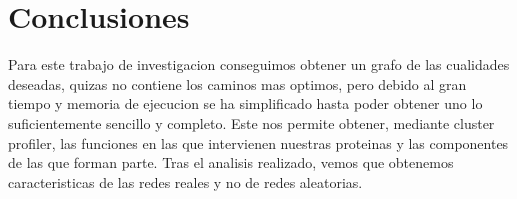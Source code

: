 \section{Conclusiones}
Para este trabajo de investigacion conseguimos obtener un grafo de las cualidades deseadas, quizas no contiene los caminos mas optimos, pero debido al gran tiempo y memoria de ejecucion se ha simplificado hasta poder obtener uno lo suficientemente sencillo y completo. Este nos permite obtener, mediante cluster profiler, las funciones en las que intervienen nuestras proteinas y las componentes de las que forman parte. Tras el analisis realizado, vemos que obtenemos caracteristicas de las redes reales y no de redes aleatorias. 
